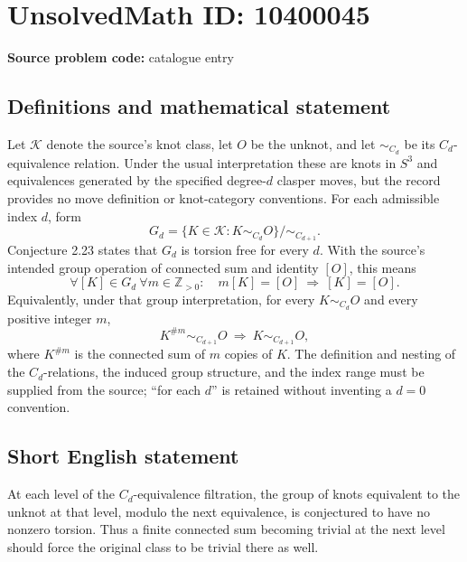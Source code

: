 \documentclass[11pt]{article}
\newcommand{\Z}{\mathbb{Z}}
\begin{document}
\section*{UnsolvedMath ID: 10400045}
\textbf{Source problem code:} catalogue entry
\subsection{Definitions and mathematical statement}
Let \(\mathcal K\) denote the source's knot class, let \(O\) be the unknot, and let \(\sim_{C_d}\) be its \(C_d\)-equivalence relation. Under the usual interpretation these are knots in \(S^3\) and equivalences generated by the specified degree-\(d\) clasper moves, but the record provides no move definition or knot-category conventions. For each admissible index \(d\), form
\[
 G_d=\{K\in\mathcal K:K\sim_{C_d}O\}/\sim_{C_{d+1}}.
\]
Conjecture 2.23 states that \(G_d\) is torsion free for every \(d\). With the source's intended group operation of connected sum and identity \([O]\), this means
\[
 \forall [K]\in G_d\ \forall m\in\Z_{>0}:\quad
 m[K]=[O]\ \Longrightarrow\ [K]=[O].
\]
Equivalently, under that group interpretation, for every \(K\sim_{C_d}O\) and every positive integer \(m\),
\[
 K^{\# m}\sim_{C_{d+1}}O\ \Longrightarrow\ K\sim_{C_{d+1}}O,
\]
where \(K^{\#m}\) is the connected sum of \(m\) copies of \(K\). The definition and nesting of the \(C_d\)-relations, the induced group structure, and the index range must be supplied from the source; ``for each \(d\)'' is retained without inventing a \(d=0\) convention.
\subsection{Short English statement}
At each level of the \(C_d\)-equivalence filtration, the group of knots equivalent to the unknot at that level, modulo the next equivalence, is conjectured to have no nonzero torsion. Thus a finite connected sum becoming trivial at the next level should force the original class to be trivial there as well.
\end{document}
